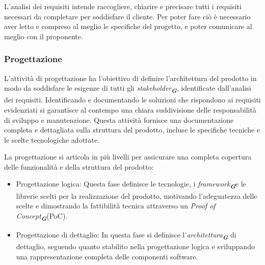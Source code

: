 L’analisi dei requisiti intende raccogliere, chiarire e precisare tutti i requisiti necessari da completare per soddisfare il cliente. Per poter fare ciò è necessario aver letto e compreso al meglio le specifiche del progetto, e poter comunicare al meglio con il proponente.


\subsubsection{Progettazione}

L'attività di progettazione ha l'obiettivo di definire l'architettura del prodotto in modo da soddisfare le esigenze di tutti gli \emph{stakeholder}\textsubscript{\textit{\textbf{G}}}, identificate dall’analisi dei requisiti. Identificando e documentando le soluzioni che rispondono ai requisiti evidenziati si garantisce al contempo una chiara suddivisione delle responsabilità di sviluppo e manutenzione. Questa attività fornisce una documentazione completa e dettagliata sulla struttura del prodotto, incluse le specifiche tecniche e le scelte tecnologiche adottate. 

La progettazione si articola in più livelli per assicurare una completa copertura delle funzionalità e della struttura del prodotto:
\begin{itemize}
\item Progettazione logica: Questa fase definisce le tecnologie, i \emph{framework}\textsubscript{\textit{\textbf{G}}}e le librerie scelti per la realizzazione del prodotto, motivando l'adeguatezza delle scelte e dimostrando la fattibilità tecnica attraverso un \emph{Proof of Concept}\textsubscript{\textit{\textbf{G}}}(PoC).
\item Progettazione di dettaglio: In questa fase si definisce l'\emph{architettura}\textsubscript{\textit{\textbf{G}}} di dettaglio, seguendo quanto stabilito nella progettazione logica e sviluppando una rappresentazione completa delle componenti software.
\end{itemize}


